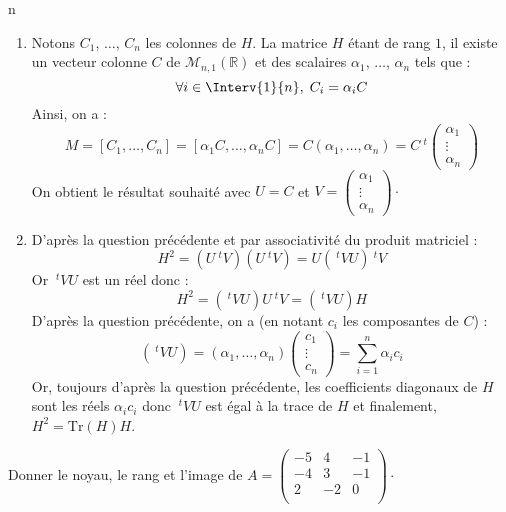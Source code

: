 n\documentclass[a4paper,10pt]{report}
\begin{document}
\begin{enumerate}
\item Notons $C_1$, $\ldots$, $C_n$ les colonnes de $H$. La matrice $H$ étant de rang $1$, il existe un vecteur colonne $C$ de $\mathcal{M}_{n,1}(\mathbb{R})$ et des scalaires $\alpha_1$, $\ldots$, $\alpha_n$ tels que :
$$ \forall i \in \Interv{1}{n}, \; C_i =\alpha_i C $$
Ainsi, on a :
$$ M = [C_1, \ldots, C_n] = [\alpha_1 C, \ldots, \alpha_n C] = C (\alpha_1, \ldots, \alpha_n) = C~^t \begin{pmatrix}
\alpha_1 \\
\vdots \\
\alpha_n
\end{pmatrix}$$
On obtient le résultat souhaité avec $U=C$ et $V = \begin{pmatrix}
\alpha_1 \\
\vdots \\
\alpha_n
\end{pmatrix} \cdot$
\item D'après la question précédente et par associativité du produit matriciel :
$$ H^2 = (U ~^tV) (U ~^tV) = U( ~^tVU )~^tV$$
Or $~^tVU$ est un réel donc :
$$ H^2 = (~^tVU ) U ~^tV =  (~^tVU ) H$$
D'après la question précédente, on a (en notant $c_i$ les composantes de $C$) :
$$ (~^tVU ) = (\alpha_1, \ldots, \alpha_n) \begin{pmatrix}
c_1 \\
\vdots \\
c_n
\end{pmatrix} = \sum_{i=1}^n \alpha_i c_i $$
Or, toujours d'après la question précédente, les coefficients diagonaux de $H$ sont les réels $\alpha_i c_i$ donc $~^tVU $ est égal à la trace de $H$ et finalement, $H^2 = \textrm{Tr}(H)H$.
\end{enumerate}

\begin{Exa} Donner le noyau, le rang et l'image de $A = \begin{pmatrix}
-5 & 4 & -1 \\
-4 & 3 & - 1 \\
2 	 & -2 & 0 \\
\end{pmatrix}\cdot$
\end{Exa}
\end{document}
